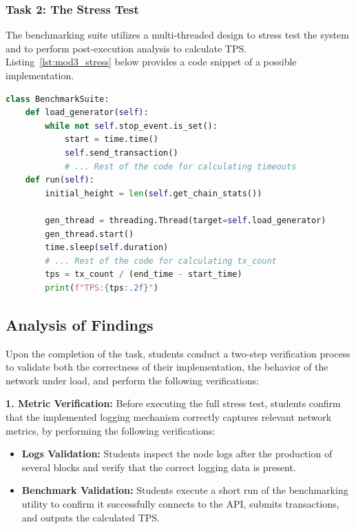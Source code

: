 \subsubsection*{Task 2: The Stress Test}
The benchmarking suite utilizes a multi-threaded design to stress test the system and to perform post-execution analysis to calculate TPS. Listing~\ref{lst:mod3_stress} below provides a code snippet of a possible implementation.
\begin{lstlisting}[language=Python, caption=Benchmark Suite Structure Code Snippet, label=lst:mod3_stress]
class BenchmarkSuite:
    def load_generator(self):
        while not self.stop_event.is_set():
            start = time.time()
            self.send_transaction()
            # ... Rest of the code for calculating timeouts
    def run(self):
        initial_height = len(self.get_chain_stats())
        
        gen_thread = threading.Thread(target=self.load_generator)
        gen_thread.start()
        time.sleep(self.duration)
        # ... Rest of the code for calculating tx_count
        tps = tx_count / (end_time - start_time)
        print(f"TPS:{tps:.2f}")
\end{lstlisting}


\subsection{Analysis of Findings}

Upon the completion of the task, students conduct a two-step verification process to validate both the correctness of their implementation, the behavior of the network under load, and perform the following verifications:


\textbf{1. Metric Verification:}
Before executing the full stress test, students confirm that the implemented logging mechanism correctly captures relevant network metrics, by performing the following verifications:

\begin{itemize}
     \item \textbf{Logs Validation:}  
    Students inspect the node logs after the production of several blocks and verify that the correct logging data is present.

    \item \textbf{Benchmark Validation:}  
    Students execute a short run of the benchmarking utility to confirm it successfully connects to the API, submits transactions, and outputs the calculated TPS.

\end{itemize}

